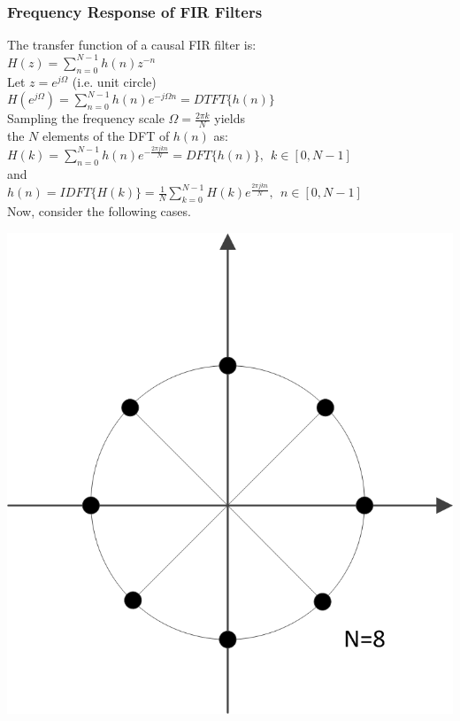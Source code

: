 \documentclass[mathserif, 10pt]{beamer} %
\begin{document}
\frame
{
\vspace{-.4in}
\small
\frametitle{Frequency Response of FIR Filters}

The transfer function of a causal FIR filter is:\\ \vspace{.1in}
$H(z) = \sum\limits_{n=0}^{N-1} h(n) z^{-n}$\\
Let $z = e^{j\Omega}$ (i.e. unit circle)\\
$H(e^{j\Omega}) = \sum\limits_{n=0}^{N-1} h(n) e^{-j\Omega n} = DTFT\{h(n)\}$\\
Sampling the frequency scale $\Omega = \frac{2\pi k}{N}$ yields \\the $N$ elements of the DFT of $h(n)$ as:\\ \vspace{.1in}
$H(k) = \sum\limits_{n=0}^{N-1} h(n) e^{-\frac{2\pi j k n}{N}} = DFT \{h(n)\}, ~~k\in [0,N-1]$\\
and\\
$h(n) = IDFT\{H(k)\} = \frac{1}{N}\sum\limits_{k=0}^{N-1} H(k) e^{\frac{2 \pi j kn}{N}},~~n \in[0,N-1]$\\

Now, consider the following cases. \vspace{.1in}

\vspace{-2.4in}
\hspace{2.9in}
\includegraphics[width=.275\linewidth]{./Figures/sample.png}




}
\end{document}
